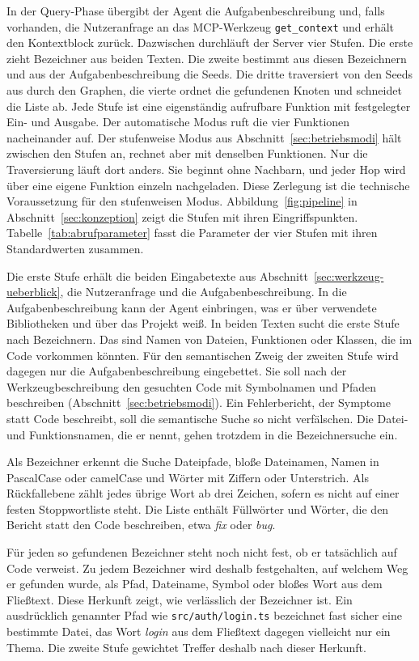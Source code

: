 In der Query-Phase übergibt der Agent die Aufgabenbeschreibung und, falls vorhanden, die Nutzeranfrage an das MCP-Werkzeug \texttt{get\_context} und erhält den Kontextblock zurück. Dazwischen durchläuft der Server vier Stufen. Die erste zieht Bezeichner aus beiden Texten. Die zweite bestimmt aus diesen Bezeichnern und aus der Aufgabenbeschreibung die Seeds. Die dritte traversiert von den Seeds aus durch den Graphen, die vierte ordnet die gefundenen Knoten und schneidet die Liste ab. Jede Stufe ist eine eigenständig aufrufbare Funktion mit festgelegter Ein- und Ausgabe. Der automatische Modus ruft die vier Funktionen nacheinander auf. Der stufenweise Modus aus Abschnitt~\ref{sec:betriebsmodi} hält zwischen den Stufen an, rechnet aber mit denselben Funktionen. Nur die Traversierung läuft dort anders. Sie beginnt ohne Nachbarn, und jeder Hop wird über eine eigene Funktion einzeln nachgeladen. Diese Zerlegung ist die technische Voraussetzung für den stufenweisen Modus. Abbildung~\ref{fig:pipeline} in Abschnitt~\ref{sec:konzeption} zeigt die Stufen mit ihren Eingriffspunkten. Tabelle~\ref{tab:abrufparameter} fasst die Parameter der vier Stufen mit ihren Standardwerten zusammen.

Die erste Stufe erhält die beiden Eingabetexte aus Abschnitt~\ref{sec:werkzeug-ueberblick}, die Nutzeranfrage und die Aufgabenbeschreibung. In die Aufgabenbeschreibung kann der Agent einbringen, was er über verwendete Bibliotheken und über das Projekt weiß. In beiden Texten sucht die erste Stufe nach Bezeichnern. Das sind Namen von Dateien, Funktionen oder Klassen, die im Code vorkommen könnten. Für den semantischen Zweig der zweiten Stufe wird dagegen nur die Aufgabenbeschreibung eingebettet. Sie soll nach der Werkzeugbeschreibung den gesuchten Code mit Symbolnamen und Pfaden beschreiben (Abschnitt~\ref{sec:betriebsmodi}). Ein Fehlerbericht, der Symptome statt Code beschreibt, soll die semantische Suche so nicht verfälschen. Die Datei- und Funktionsnamen, die er nennt, gehen trotzdem in die Bezeichnersuche ein.

Als Bezeichner erkennt die Suche Dateipfade, bloße Dateinamen, Namen in PascalCase oder camelCase und Wörter mit Ziffern oder Unterstrich. Als Rückfallebene zählt jedes übrige Wort ab drei Zeichen, sofern es nicht auf einer festen Stoppwortliste steht. Die Liste enthält Füllwörter und Wörter, die den Bericht statt den Code beschreiben, etwa \emph{fix} oder \emph{bug}.

Für jeden so gefundenen Bezeichner steht noch nicht fest, ob er tatsächlich auf Code verweist. Zu jedem Bezeichner wird deshalb festgehalten, auf welchem Weg er gefunden wurde, als Pfad, Dateiname, Symbol oder bloßes Wort aus dem Fließtext. Diese Herkunft zeigt, wie verlässlich der Bezeichner ist. Ein ausdrücklich genannter Pfad wie \texttt{src/auth/login.ts} bezeichnet fast sicher eine bestimmte Datei, das Wort \emph{login} aus dem Fließtext dagegen vielleicht nur ein Thema. Die zweite Stufe gewichtet Treffer deshalb nach dieser Herkunft.

